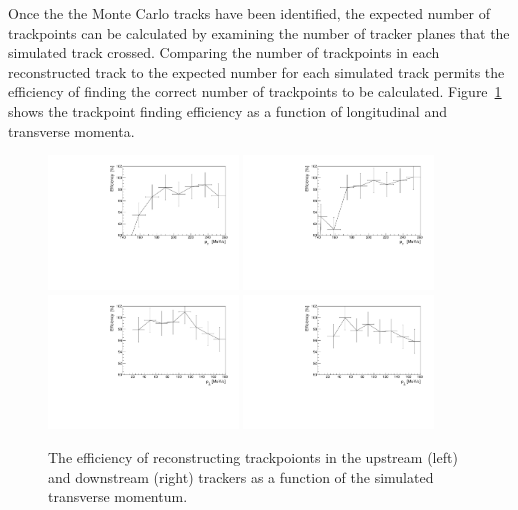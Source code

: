   Once the the Monte Carlo tracks have been identified, the expected number of trackpoints can be calculated by examining the number of tracker planes that the simulated track crossed. Comparing the number of trackpoints in each reconstructed track to the expected number for each simulated track permits the efficiency of finding the correct number of trackpoints to be calculated. Figure~\ref{fig:tp_efficiency} shows the trackpoint finding efficiency as a function of longitudinal and transverse momenta.

  \begin{figure}[p]
    \centering
    \includegraphics[width=0.45\textwidth, angle=0]{08-Performance/upstream_pz_tp_efficiency.pdf}
    \includegraphics[width=0.45\textwidth, angle=0]{08-Performance/downstream_pz_tp_efficiency.pdf}\\
    \includegraphics[width=0.45\textwidth, angle=0]{08-Performance/upstream_pt_tp_efficiency.pdf}
    \includegraphics[width=0.45\textwidth, angle=0]{08-Performance/downstream_pt_tp_efficiency.pdf}
    \caption{\label{fig:tp_efficiency} The efficiency of reconstructing trackpoionts in the upstream (left) and downstream (right) trackers as a function of the simulated transverse momentum.}
  \end{figure}


